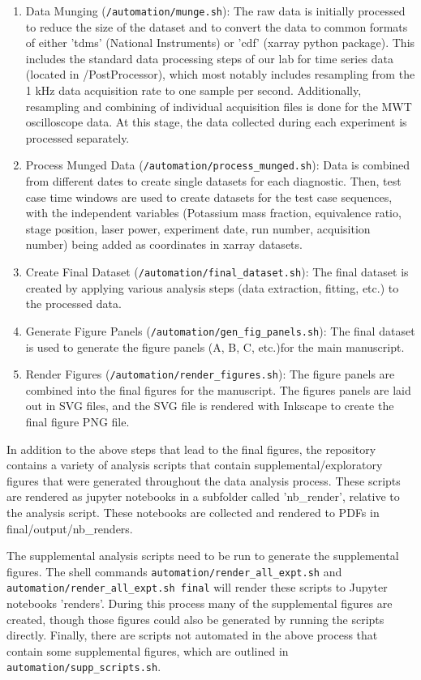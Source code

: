 \begin{enumerate}
    \item Data Munging (\texttt{/automation/munge.sh}): The raw data is initially processed to reduce the size of the dataset and to convert the data to common formats of either 'tdms' (National Instruments) or 'cdf' (xarray python package). This includes the standard data processing steps of our lab for time series data (located in /PostProcessor), which most notably includes resampling from the 1 kHz data acquisition rate to one sample per second. Additionally, resampling and combining of individual acquisition files is done for the MWT oscilloscope data.  At this stage, the data collected during each experiment is processed separately.
    \item Process Munged Data (\texttt{/automation/process\_munged.sh}): Data is combined from different dates to create single datasets for each diagnostic. Then, test case time windows are used to create datasets for the test case sequences, with the independent variables (Potassium mass fraction, equivalence ratio, stage position, laser power, experiment date, run number, acquisition number) being added as coordinates in xarray datasets.
    \item Create Final Dataset (\texttt{/automation/final\_dataset.sh}): The final dataset is created by applying various analysis steps (data extraction, fitting, etc.) to the processed data. 
    \item Generate Figure Panels (\texttt{/automation/gen\_fig\_panels.sh}): The final dataset is used to generate the figure panels (A, B, C, etc.)for the main manuscript. 
    \item Render Figures (\texttt{/automation/render\_figures.sh}): The figure panels are combined into the final figures for the manuscript. The figures panels are laid out in SVG files, and the SVG file is rendered with Inkscape to create the final figure PNG file. 
\end{enumerate}

In addition to the above steps that lead to the final figures, the repository contains a variety of analysis scripts that contain supplemental/exploratory figures that were generated throughout the data analysis process. These scripts are rendered as jupyter notebooks in a subfolder called 'nb\_render', relative to the analysis script. These notebooks are collected and rendered to PDFs in final/output/nb\_renders. 

The supplemental analysis scripts need to be run to generate the supplemental figures. The shell commands \texttt{automation/render\_all\_expt.sh} and \texttt{automation/render\_all\_expt.sh final} will render these scripts to Jupyter notebooks 'renders'. During this process many of the supplemental figures are created, though those figures could also be generated by running the scripts directly. Finally, there are scripts not automated in the above process that contain some supplemental figures, which are outlined in \texttt{automation/supp\_scripts.sh}. 

